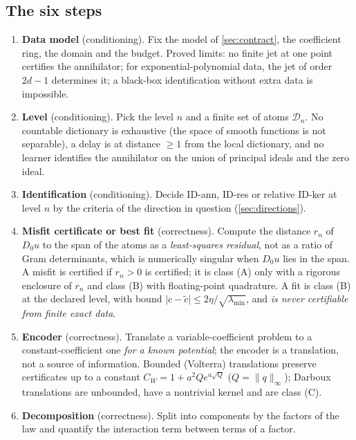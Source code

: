 \subsection{The six steps}
\begin{enumerate}
\item \textbf{Data model} (conditioning). Fix the model of \cref{sec:contract}, the coefficient ring, the domain and the budget.
  Proved limits: no finite jet at one point certifies the annihilator; for exponential-polynomial data, the jet of order $2d-1$ determines it; a black-box
  identification without extra data is impossible.
\item \textbf{Level} (conditioning). Pick the level $n$ and a finite set of atoms $\mathcal D_n$. No countable dictionary is exhaustive (the space of smooth functions
  is not separable), a delay is at distance $\ge1$ from the local dictionary, and no learner identifies the annihilator on the union of principal ideals and the zero ideal.
\item \textbf{Identification} (conditioning). Decide ID-ann, ID-res or relative ID-ker at level $n$ by the criteria of the direction in question (\cref{sec:directions}).
\item \textbf{Misfit certificate or best fit} (correctness). Compute the distance $r_n$ of $D_0u$ to the span of the atoms as a \emph{least-squares residual}, not as a ratio of Gram determinants, which is numerically
  singular when $D_0u$ lies in the span. A misfit is certified if $r_n>0$ is certified; it is class (A) only with a rigorous enclosure of $r_n$ and class (B) with floating-point quadrature.
  A fit is class (B) at the declared level, with bound $\lvert c-\tilde c\rvert\le2\eta/\sqrt{\lambda_{\min}}$, and \emph{is never certifiable from finite exact data}.
\item \textbf{Encoder} (correctness). Translate a variable-coefficient problem to a constant-coefficient one \emph{for a known potential}; the encoder is a translation, not a source of information.
  Bounded (Volterra) translations preserve certificates up to a constant $C_W=1+a^2Qe^{a\sqrt Q}$ ($Q=\lVert q\rVert_\infty$); Darboux translations are unbounded, have a nontrivial kernel and are class (C).
\item \textbf{Decomposition} (correctness). Split into components by the factors of the law and quantify the interaction term between terms of a factor.
\end{enumerate}

